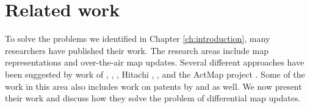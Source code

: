 

\chapter{Related work}\label{ch:relatedwork}

To solve the problems we identified in Chapter \ref{ch:introduction}, many researchers have published their work. The research areas include map representations and over-the-air map updates. Several different approaches have been suggested by work of \citet{min2008mobile}, \citet{asahara2008locally}, \citet{cooper2001incremental}, Hitachi \cite{hitachi}, \citet{bastiaensen2003actmap}, \citet{sakamoto2000proposal} and the ActMap project \cite{flament2003actmap}. Some of the work in this area also includes work on patents by \citet{kato2002method} and \citet{fischer2012technique} as well. We now present their work and discuss how they solve the problem of differential map updates.





